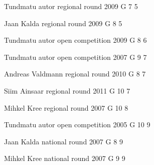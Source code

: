 \documentclass[11pt]{article}
\begin{document}
\ylDisplay{} %
{Tundmatu autor} %
{regional round} %
{2009} %
{G 7} %
{5} %
{

\ifEngSolution
\fi
}

\ylDisplay{} %
{Jaan Kalda} %
{regional round} %
{2009} %
{G 8} %
{5} %
{

\ifEngSolution
\fi
}

\ylDisplay{} %
{Tundmatu autor} %
{open competition} %
{2009} %
{G 8} %
{6} %
{

\ifEngSolution
\fi
}

\ylDisplay{} %
{Tundmatu autor} %
{open competition} %
{2007} %
{G 9} %
{7} %
{

\ifEngSolution
\fi
}

\ylDisplay{} %
{Andreas Valdmann} %
{regional round} %
{2010} %
{G 8} %
{7} %
{

\ifEngSolution
\fi
}

\ylDisplay{} %
{Siim Ainsaar} %
{regional round} %
{2011} %
{G 10} %
{7} %
{

\ifEngSolution
\fi
}

\ylDisplay{} %
{Mihkel Kree} %
{regional round} %
{2007} %
{G 10} %
{8} %
{

\ifEngSolution
\fi
}

\ylDisplay{} %
{Tundmatu autor} %
{open competition} %
{2005} %
{G 10} %
{9} %
{

\ifEngSolution
\fi
}

\ylDisplay{} %
{Jaan Kalda} %
{national round} %
{2007} %
{G 8} %
{9} %
{

\ifEngSolution
\fi
}

\ylDisplay{} %
{Mihkel Kree} %
{national round} %
{2007} %
{G 9} %
{9} %
{

\ifEngSolution
\fi
}
\end{document}
